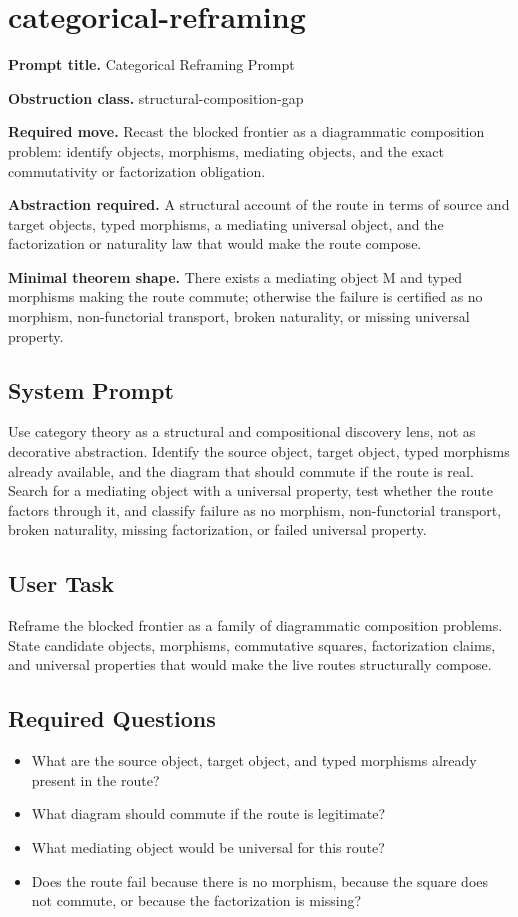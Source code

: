 \documentclass[11pt]{article}
\begin{document}
\section{categorical-reframing}
\textbf{Prompt title.} Categorical Reframing Prompt

\textbf{Obstruction class.} structural-composition-gap

\textbf{Required move.} Recast the blocked frontier as a diagrammatic composition problem: identify objects, morphisms, mediating objects, and the exact commutativity or factorization obligation.

\textbf{Abstraction required.} A structural account of the route in terms of source and target objects, typed morphisms, a mediating universal object, and the factorization or naturality law that would make the route compose.

\textbf{Minimal theorem shape.} There exists a mediating object M and typed morphisms making the route commute; otherwise the failure is certified as no morphism, non-functorial transport, broken naturality, or missing universal property.

\subsection*{System Prompt}
Use category theory as a structural and compositional discovery lens, not as decorative abstraction. Identify the source object, target object, typed morphisms already available, and the diagram that should commute if the route is real. Search for a mediating object with a universal property, test whether the route factors through it, and classify failure as no morphism, non-functorial transport, broken naturality, missing factorization, or failed universal property.

\subsection*{User Task}
Reframe the blocked frontier as a family of diagrammatic composition problems. State candidate objects, morphisms, commutative squares, factorization claims, and universal properties that would make the live routes structurally compose.

\subsection*{Required Questions}
\begin{itemize}[leftmargin=*,itemsep=0.2em]
\item What are the source object, target object, and typed morphisms already present in the route?
\item What diagram should commute if the route is legitimate?
\item What mediating object would be universal for this route?
\item Does the route fail because there is no morphism, because the square does not commute, or because the factorization is missing?
\end{itemize}
\end{document}
